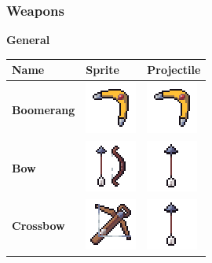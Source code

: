 \documentclass[../Main.tex]{subfiles}
\begin{document}
        \subsubsection{Weapons}
            \textbf{General}
            \begin{center}
                \begin{tabular}{ | m{} | m{} | m{} | }
                    \hline
                    \textbf{Name} & \textbf{Sprite} & \textbf{Projectile} \\
                    \hline
                    \textbf{Boomerang} & \centerline{\includegraphics[scale=1]{../res/textures/items/weapons/Boomerang.png}} & \centerline{\includegraphics[scale=1]{../res/textures/items/weapons/Boomerang.png}} \\
                    \hline
                    \textbf{Bow} & \centerline{\includegraphics[scale=1]{../res/textures/items/weapons/Bow.png}} & \centerline{\includegraphics[scale=3]{../res/textures/projectiles/Arrow.png}} \\
                    \hline
                    \textbf{Crossbow} & \centerline{\includegraphics[scale=1]{../res/textures/items/weapons/Crossbow.png}} & \centerline{\includegraphics[scale=3]{../res/textures/projectiles/Arrow.png}} \\

\end{tabular}
\end{center}
\end{document}
